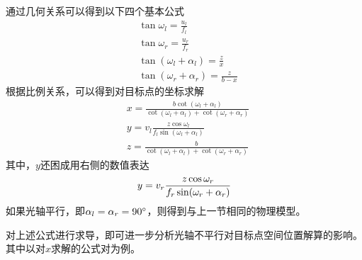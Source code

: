 通过几何关系可以得到以下四个基本公式
\begin{align}
&\tan \omega_l = \frac{u_l}{f_l} \\
&\tan \omega_r = \frac{u_r}{f_r} \\
&\tan(\omega_l+\alpha_l) = \frac{z}{x}  \\
&\tan(\omega_r+\alpha_r) = \frac{z}{b-x}
\end{align}
根据比例关系，可以得到对目标点的坐标求解
\begin{align}
&x = \frac{b\cot(\omega_l+\alpha_l)}{\cot(\omega_l+\alpha_l) + \cot(\omega_r+\alpha_r)} \\
&y = v_l \frac{z \cos\omega_l}{f_l \sin (\omega_l + \alpha_l)} \\
&z = \frac{b}{\cot(\omega_l+\alpha_l) + \cot(\omega_r+\alpha_r)}
\end{align}
其中，$y$还困成用右侧的数值表达
\begin{equation}
y = v_r \frac{z \cos\omega_r}{f_r \sin (\omega_r + \alpha_r)} \\
\end{equation}
如果光轴平行，即$\alpha_l = \alpha_r = 90\degree$，则得到与上一节相同的物理模型。

对上述公式进行求导，即可进一步分析光轴不平行对目标点空间位置解算的影响。其中以对$x$求解的公式对为例。

